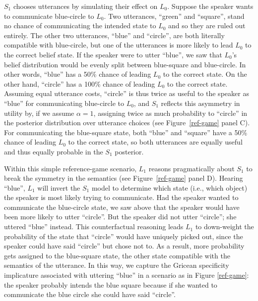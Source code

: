 \documentclass{sp}
\begin{document}
$S_1$ chooses utterances by simulating their effect on $L_0$. Suppose the speaker wants to communicate blue-circle to $L_0$. Two utterances, ``green'' and ``square'', stand no chance of communicating the intended state to $L_0$ and so they are ruled out entirely. The other two utterances, ``blue'' and ``circle'', are both literally compatible with blue-circle, but one of the utterances is more likely to lead $L_0$ to the correct belief state. If the speaker were to utter ``blue'', we saw that $L_0$'s belief distribution would be evenly split between blue-square and blue-circle. In other words, ``blue'' has a 50\% chance of leading $L_0$ to the correct state. On the other hand, ``circle'' has a 100\% chance of leading $L_0$ to the correct state. Assuming equal utterance costs, ``circle'' is thus twice as useful to the speaker as ``blue'' for communicating blue-circle to $L_0$, and $S_1$ reflects this asymmetry in utility by, if we assume $\alpha=1$, assigning twice as much probability to ``circle'' in the posterior distribution over utterance choices (see Figure~\ref{ref-game} panel C). For communicating the blue-square state, both ``blue'' and ``square'' have a 50\% chance of leading $L_0$ to the correct state, so both utterances are equally useful and thus equally probable in the $S_1$ posterior.

Within this simple reference-game scenario, $L_1$ reasons pragmatically about $S_1$ to break the symmetry in the semantics (see Figure~\ref{ref-game} panel D). Hearing ``blue'', $L_1$ will invert the $S_1$ model to determine which state (i.e., which object) the speaker is most likely trying to communicate. Had the speaker wanted to communicate the blue-circle state, we saw above that the speaker would have been more likely to utter ``circle''. But the speaker did not utter ``circle''; she uttered ``blue'' instead. This counterfactual reasoning leads $L_1$ to down-weight the probability of the state that ``circle'' would have uniquely picked out, since the speaker could have said ``circle'' but chose not to. As a result, more probability gets assigned to the blue-square state, the other state compatible with the semantics of the utterance. In this way, we capture the Gricean specificity implicature associated with uttering ``blue'' in a scenario as in Figure \ref{ref-game}: the speaker probably intends the blue square because if she wanted to communicate the blue circle she could have said ``circle''.
\end{document}
